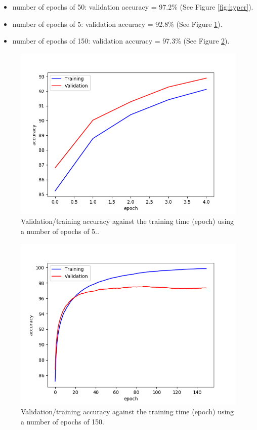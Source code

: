 \documentclass[a4paper]{article}
\begin{document}
\begin{enumerate}
\begin{itemize}

\item number of epochs of 50: validation accuracy = 97.2\% (See Figure \ref{fig:hyper}).

\item number of epochs of 5: validation accuracy = 92.8\% (See Figure \ref{fig:epoch2}).

\item number of epochs of 150: validation accuracy = 97.3\% (See Figure \ref{fig:epoch3}).  
  
\end{itemize}

\begin{figure}
\centering
\includegraphics[width=1\textwidth]{epoch2.png}
\caption{\label{fig:epoch2}Validation/training accuracy against the training time (epoch) using a number of epochs of 5..}
\end{figure}

\begin{figure}
\centering
\includegraphics[width=1\textwidth]{epoch3.png}
\caption{\label{fig:epoch3}Validation/training accuracy against the training time (epoch) using a number of epochs of 150.}
\end{figure}


\end{enumerate}
\end{document}
